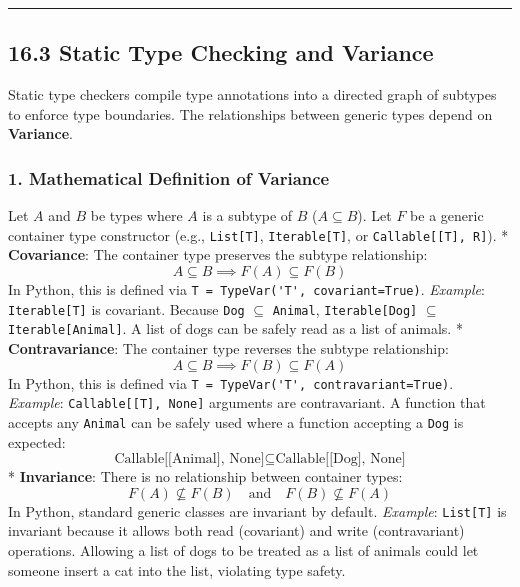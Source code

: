 \begin{center}\rule{0.5\linewidth}{0.5pt}\end{center}

\hypertarget{static-type-checking-and-variance}{%
\subsection{16.3 Static Type Checking and
Variance}\label{static-type-checking-and-variance}}

Static type checkers compile type annotations into a directed graph of
subtypes to enforce type boundaries. The relationships between generic
types depend on \textbf{Variance}.

\hypertarget{mathematical-definition-of-variance}{%
\subsubsection{1. Mathematical Definition of
Variance}\label{mathematical-definition-of-variance}}

Let \(A\) and \(B\) be types where \(A\) is a subtype of \(B\)
(\(A \subseteq B\)). Let \(F\) be a generic container type constructor
(e.g., \passthrough{\lstinline!List[T]!},
\passthrough{\lstinline!Iterable[T]!}, or
\passthrough{\lstinline!Callable[[T], R]!}). * \textbf{Covariance}: The
container type preserves the subtype relationship:
\[A \subseteq B \implies F(A) \subseteq F(B)\] In Python, this is
defined via \passthrough{\lstinline!T = TypeVar('T', covariant=True)!}.
\emph{Example}: \passthrough{\lstinline!Iterable[T]!} is covariant.
Because \passthrough{\lstinline!Dog!} \(\subseteq\)
\passthrough{\lstinline!Animal!},
\passthrough{\lstinline!Iterable[Dog]!} \(\subseteq\)
\passthrough{\lstinline!Iterable[Animal]!}. A list of dogs can be safely
read as a list of animals. * \textbf{Contravariance}: The container type
reverses the subtype relationship:
\[A \subseteq B \implies F(B) \subseteq F(A)\] In Python, this is
defined via
\passthrough{\lstinline!T = TypeVar('T', contravariant=True)!}.
\emph{Example}: \passthrough{\lstinline!Callable[[T], None]!} arguments
are contravariant. A function that accepts any
\passthrough{\lstinline!Animal!} can be safely used where a function
accepting a \passthrough{\lstinline!Dog!} is expected:
\[\text{Callable[[Animal], None]} \subseteq \text{Callable[[Dog], None]}\]
* \textbf{Invariance}: There is no relationship between container types:
\[F(A) \not\subseteq F(B) \quad \text{and} \quad F(B) \not\subseteq F(A)\]
In Python, standard generic classes are invariant by default.
\emph{Example}: \passthrough{\lstinline!List[T]!} is invariant because
it allows both read (covariant) and write (contravariant) operations.
Allowing a list of dogs to be treated as a list of animals could let
someone insert a cat into the list, violating type safety.

